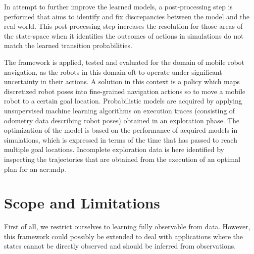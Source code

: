 In attempt to further improve the learned models, a post-processing step is performed that aims to identify and fix discrepancies between the model and the real-world.
This post-processing step increases the resolution for those areas of the state-space when it identifies the outcomes of actions in simulations do not match the learned transition probabilities.

The framework is applied, tested and evaluated for the domain of mobile robot navigation, as the robots in this domain oft to operate under significant uncertainty in their actions.
A solution in this context is a policy which maps discretized robot poses into fine-grained navigation actions so to move a mobile robot to a certain goal location.
Probabilistic models are acquired by applying unsupervised machine learning algorithms on execution traces (consisting of odometry data describing robot poses) obtained in an exploration phase.
The optimization of the model is based on the performance of acquired models in simulations, which is expressed in terms of the time that has passed to reach multiple goal locations.
Incomplete exploration data is here identified by inspecting the trajectories that are obtained from the execution of an optimal plan for an \acrshort{acr:mdp}.



\section{Scope and Limitations}
\label{sec:scope-limitations}

First of all, we restrict ourselves to learning fully observable  from data.
However, this framework could possibly be extended to deal with applications where the states cannot be directly observed and should be inferred from observations.

